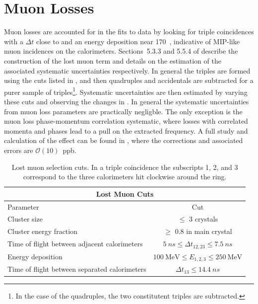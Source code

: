 
\graphicspath{{Body/Figures/MuonLosses/}}

\section{Muon Losses}


Muon losses are accounted for in the fits to data by looking for triple coincidences with a $\Delta t$ close to  and an energy deposition near 170~\MeV, indicative of MIP-like muon incidences on the calorimeters. Sections~5.3.3 and 5.5.4 of  describe the construction of the lost muon term and details on the estimation of the associated systematic uncertainties respectively. In general the triples are formed using the cuts listed in , and then quadruples and accidentals are subtracted for a purer sample of triples\footnote{In the case of the quadruples, the two constitutent triples are subtracted.}. Systematic uncertainties are then estimated by varying these cuts and observing the changes in \R. In general the systematic uncertainties from muon loss parameters are practically negligble. The only exception is the muon loss phase-momentum correlation systematic, where losses with correlated momenta and phases lead to a pull on the extracted \wa frequency. A full study and calculation of the effect can be found in , where the corrections and associated errors are $\mathcal{O}(10)$~ppb.



\begin{table}[h]
\centering
\setlength\tabcolsep{10pt}
\renewcommand{\arraystretch}{1.2}
\begin{tabular*}{1\linewidth}{@{\extracolsep{\fill}}lc}
  \hline
    \multicolumn{2}{c}{\textbf{Lost Muon Cuts}} \\
  \hline\hline
    Parameter & Cut \\
  \hline
    Cluster size & $\leq$ 3 crystals \\
    Cluster energy fraction & $\geq$ 0.8 in main crystal \\
    Time of flight between adjacent calorimeters & $\SI{5}{ns} \leq \Delta t_{12, 23} \leq \SI{7.5}{ns}$ \\
    Energy deposition & $\SI{100}{\MeV} \leq E_{1,2,3} \leq \SI{250}{\MeV}$ \\
    Time of flight between separated calorimeters & $\Delta t_{13} \leq \SI{14.4}{ns}$ \\
  \hline 
\end{tabular*}
\caption[Lost muon cuts]{Lost muon selection cuts. In a triple coincidence the subscripts 1, 2, and 3 correspond to the three calorimeters hit clockwise around the ring.}
\label{tab:lostmuoncuts}
\end{table}



